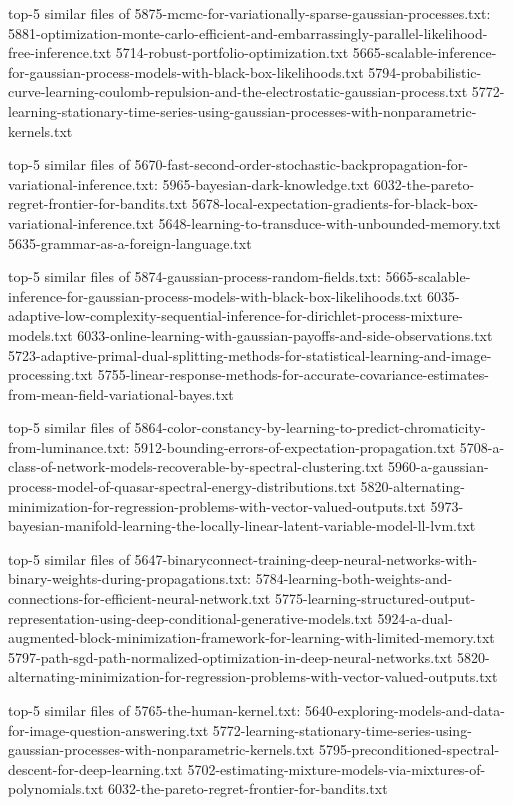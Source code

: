 \documentclass[11pt]{article}
\begin{document}
top-5 similar files of
5875-mcmc-for-variationally-sparse-gaussian-processes.txt:
5881-optimization-monte-carlo-efficient-and-embarrassingly-parallel-likelihood-free-inference.txt
5714-robust-portfolio-optimization.txt
5665-scalable-inference-for-gaussian-process-models-with-black-box-likelihoods.txt
5794-probabilistic-curve-learning-coulomb-repulsion-and-the-electrostatic-gaussian-process.txt
5772-learning-stationary-time-series-using-gaussian-processes-with-nonparametric-kernels.txt

top-5 similar files of
5670-fast-second-order-stochastic-backpropagation-for-variational-inference.txt:
5965-bayesian-dark-knowledge.txt
6032-the-pareto-regret-frontier-for-bandits.txt
5678-local-expectation-gradients-for-black-box-variational-inference.txt
5648-learning-to-transduce-with-unbounded-memory.txt
5635-grammar-as-a-foreign-language.txt

top-5 similar files of 5874-gaussian-process-random-fields.txt:
5665-scalable-inference-for-gaussian-process-models-with-black-box-likelihoods.txt
6035-adaptive-low-complexity-sequential-inference-for-dirichlet-process-mixture-models.txt
6033-online-learning-with-gaussian-payoffs-and-side-observations.txt
5723-adaptive-primal-dual-splitting-methods-for-statistical-learning-and-image-processing.txt
5755-linear-response-methods-for-accurate-covariance-estimates-from-mean-field-variational-bayes.txt

top-5 similar files of
5864-color-constancy-by-learning-to-predict-chromaticity-from-luminance.txt:
5912-bounding-errors-of-expectation-propagation.txt
5708-a-class-of-network-models-recoverable-by-spectral-clustering.txt
5960-a-gaussian-process-model-of-quasar-spectral-energy-distributions.txt
5820-alternating-minimization-for-regression-problems-with-vector-valued-outputs.txt
5973-bayesian-manifold-learning-the-locally-linear-latent-variable-model-ll-lvm.txt

top-5 similar files of
5647-binaryconnect-training-deep-neural-networks-with-binary-weights-during-propagations.txt:
5784-learning-both-weights-and-connections-for-efficient-neural-network.txt
5775-learning-structured-output-representation-using-deep-conditional-generative-models.txt
5924-a-dual-augmented-block-minimization-framework-for-learning-with-limited-memory.txt
5797-path-sgd-path-normalized-optimization-in-deep-neural-networks.txt
5820-alternating-minimization-for-regression-problems-with-vector-valued-outputs.txt

top-5 similar files of 5765-the-human-kernel.txt:
5640-exploring-models-and-data-for-image-question-answering.txt
5772-learning-stationary-time-series-using-gaussian-processes-with-nonparametric-kernels.txt
5795-preconditioned-spectral-descent-for-deep-learning.txt
5702-estimating-mixture-models-via-mixtures-of-polynomials.txt
6032-the-pareto-regret-frontier-for-bandits.txt
\end{document}

